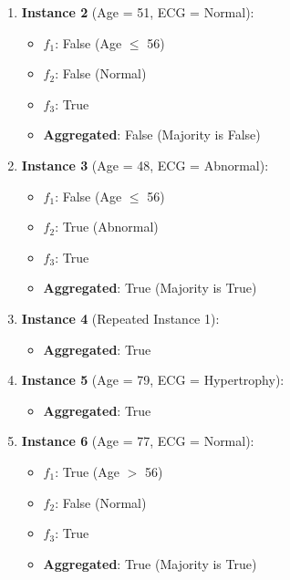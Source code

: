 \documentclass{article}
\begin{document}
\begin{enumerate}
\begin{enumerate}
    \item \textbf{Instance 2} (Age = 51, ECG = Normal):
    \begin{itemize}
        \item $f_1$: False (Age $\leq$ 56)
        \item $f_2$: False (Normal)
        \item $f_3$: True
        \item \textbf{Aggregated}: False (Majority is False)
    \end{itemize}

    \item \textbf{Instance 3} (Age = 48, ECG = Abnormal):
    \begin{itemize}
        \item $f_1$: False (Age $\leq$ 56)
        \item $f_2$: True (Abnormal)
        \item $f_3$: True
        \item \textbf{Aggregated}: True (Majority is True)
    \end{itemize}

    \item \textbf{Instance 4} (Repeated Instance 1):
    \begin{itemize}
        \item \textbf{Aggregated}: True
    \end{itemize}

    \item \textbf{Instance 5} (Age = 79, ECG = Hypertrophy):
    \begin{itemize}
        \item \textbf{Aggregated}: True
    \end{itemize}

    \item \textbf{Instance 6} (Age = 77, ECG = Normal):
    \begin{itemize}
        \item $f_1$: True (Age $>$ 56)
        \item $f_2$: False (Normal)
        \item $f_3$: True
        \item \textbf{Aggregated}: True (Majority is True)
    \end{itemize}
\end{enumerate}
\break


\end{enumerate}
\end{document}
